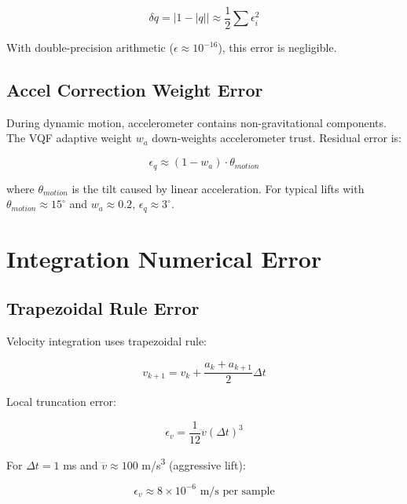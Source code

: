 \begin{equation}
    \delta q = |1 - |q|| \approx \frac{1}{2}\sum \epsilon_i^2
\end{equation}

With double-precision arithmetic ($\epsilon \approx 10^{-16}$), this error is negligible.

\subsection{Accel Correction Weight Error}

During dynamic motion, accelerometer contains non-gravitational components. The VQF adaptive weight $w_a$ down-weights accelerometer trust. Residual error is:

\begin{equation}
    \epsilon_q \approx (1 - w_a) \cdot \theta_{motion}
\end{equation}

where $\theta_{motion}$ is the tilt caused by linear acceleration. For typical lifts with $\theta_{motion} \approx 15^\circ$ and $w_a \approx 0.2$, $\epsilon_q \approx 3^\circ$.

\section{Integration Numerical Error}

\subsection{Trapezoidal Rule Error}

Velocity integration uses trapezoidal rule:

\begin{equation}
    v_{k+1} = v_k + \frac{a_k + a_{k+1}}{2} \Delta t
\end{equation}

Local truncation error:

\begin{equation}
    \epsilon_v = \frac{1}{12} \dddot{v} (\Delta t)^3
\end{equation}

For $\Delta t = 1$ ms and $\dddot{v} \approx 100$ m/s\textsuperscript{3} (aggressive lift):

\begin{equation}
    \epsilon_v \approx 8 \times 10^{-6} \text{ m/s per sample}
\end{equation}

